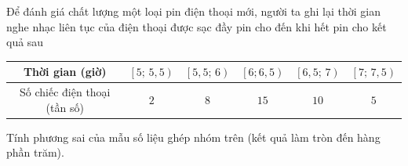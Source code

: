\begin{ex}%
	Để đánh giá chất lượng một loại pin điện thoại mới, người ta ghi lại thời gian nghe nhạc liên tục của điện thoại được sạc đầy pin cho đến khi hết pin cho kết quả sau
	\begin{center}
		\begin{tabular}{|c|c|c|c|c|c|} 
			\hline 
			Thời gian (giờ) & $\left[5;\,5{,}5\right)$ & $\left[5{,}5;\,6\right)$ & $\left[6;6{,}5\right)$ & $\left[6{,}5;\,7\right)$ & $\left[7;\,7{,}5\right)$ \\ 
			\hline 
			Số chiếc điện thoại (tần số) & $2$ & $8$ & $15$ & $10$& $5$\\ 
			\hline 
		\end{tabular}		
	\end{center}
	Tính phương sai của mẫu số liệu ghép nhóm trên (kết quả làm tròn đến hàng phần trăm).
\end{ex}

